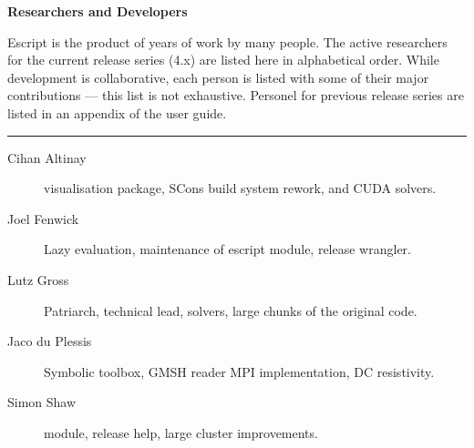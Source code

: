 
%
%
%

\vbox{}
\vfill
\begin{center}
\textbf{\Large Researchers and Developers}
\vspace{0.5cm}

Escript is the product of years of work by many people.
The active researchers for the current release series (4.x) are listed
here in alphabetical order.
While development is collaborative, each person is listed with some of their
major contributions --- this list is not exhaustive.
Personel for previous release series are listed in an appendix of the user
guide.

\vspace{1cm}
\hrule
\vspace{1cm}
\begin{description}
\item[Cihan Altinay] \weipa visualisation package, SCons build system rework, \ripley and CUDA solvers.
\item[Joel Fenwick] Lazy evaluation, maintenance of escript module, release wrangler.
\item[Lutz Gross] Patriarch, technical lead, solvers, large chunks of the original code.
\item[Jaco du Plessis] Symbolic toolbox, GMSH reader MPI implementation, DC resistivity.
\item[Simon Shaw] \speckley module, release help, large cluster improvements.
\end{description}
\end{center}
\vfill
\pagebreak

